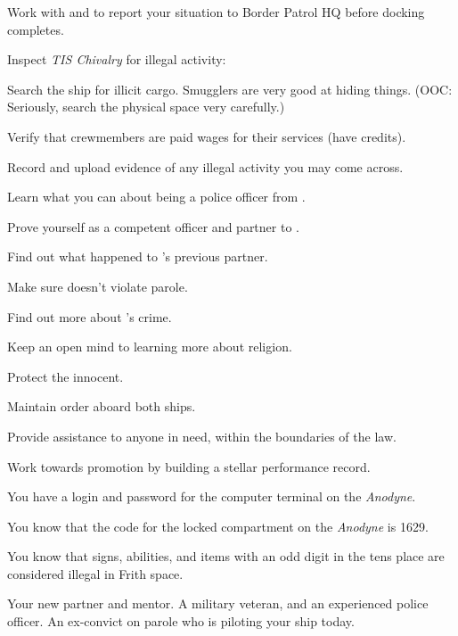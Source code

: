 \documentclass[char]{guildcamp4}
\begin{document}
\begin{itemz}[Goals]
	\item Work with \cCbad{} and \cPilot{} to report your situation to Border Patrol HQ before docking completes.
	\item Inspect \emph{TIS Chivalry} for illegal activity:
	\begin{itemz}
		\item Search the ship for illicit cargo. Smugglers are very good at hiding things. (OOC: Seriously, search the physical space very carefully.)
		\item Verify that crewmembers are paid wages for their services (have credits).
	\end{itemz}
	\item Record and upload evidence of any illegal activity you may come across.
	\item Learn what you can about being a police officer from \cCbad{}.
	\item Prove yourself as a competent officer and partner to \cCbad{}.
	\item Find out what happened to \cCbad{}'s previous partner.
	\item Make sure \cPilot{} doesn't violate \cPilot{\their} parole. 
	\item Find out more about \cPilot{}'s crime.
	\item Keep an open mind to learning more about religion.
	\item Protect the innocent.
	\item Maintain order aboard both ships.
	\item Provide assistance to anyone in need, within the boundaries of the law. 
	\item Work towards promotion by building a stellar performance record.
\end{itemz}

\begin{itemz}[Notes]
	\item You have a login and password for the computer terminal on the \emph{Anodyne}.
	\item You know that the code for the locked compartment on the \emph{Anodyne} is 1629.
	\item You know that signs, abilities, and items with an odd digit in the tens place are considered illegal in Frith space.
\end{itemz}

\begin{contacts}
	\contact{\cCbad{}} Your new partner and mentor. A military veteran, and an experienced police officer.
	\contact{\cPilot{}}	An ex-convict on parole who is piloting your ship today.
\end{contacts}
\end{document}

